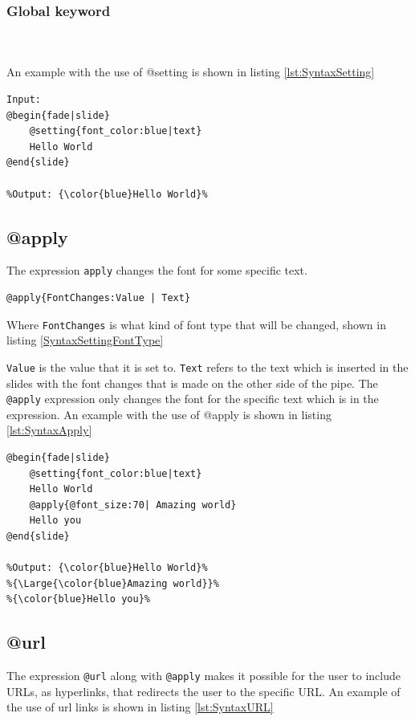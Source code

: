 {\subsubsection*{Global keyword}
\\ \\
An example with the use of @setting is shown in listing \ref{lst:SyntaxSetting}

\begin{lstlisting}[frame=single, caption=Hello World with setting, label=lst:SyntaxSetting]
Input:
@begin{fade|slide}
    @setting{font_color:blue|text}
    Hello World
@end{slide}

%Output: {\color{blue}Hello World}%
\end{lstlisting}

\subsection{@apply}
The expression \texttt{apply} changes the font for some specific text.
\begin{lstlisting}[frame=single, caption=apply expression generic]
@apply{FontChanges:Value | Text}
\end{lstlisting}
Where \texttt{FontChanges} is what kind of font type that will be changed, shown in listing \ref{SyntaxSettingFontType}

\texttt{Value} is the value that it is set to. 
\texttt{Text} refers to the text which is inserted in the slides with the font changes that is made on the other side of the pipe.
The \texttt{@apply} expression only changes the font for the specific text which is in the expression.
An example with the use of @apply is shown in listing \ref{lst:SyntaxApply}

\begin{lstlisting}[frame=single, caption=Hello World with apply, label=lst:SyntaxApply]
@begin{fade|slide}
    @setting{font_color:blue|text}
    Hello World
    @apply{@font_size:70| Amazing world}
    Hello you
@end{slide}

%Output: {\color{blue}Hello World}%
%{\Large{\color{blue}Amazing world}}%
%{\color{blue}Hello you}%
\end{lstlisting}

\subsection{@url}
The expression \texttt{@url} along with \texttt{@apply} makes it possible for the user to include URLs, as hyperlinks, that redirects the user to the specific URL.
An example of the use of url links is shown in listing \ref{lst:SyntaxURL}

}
